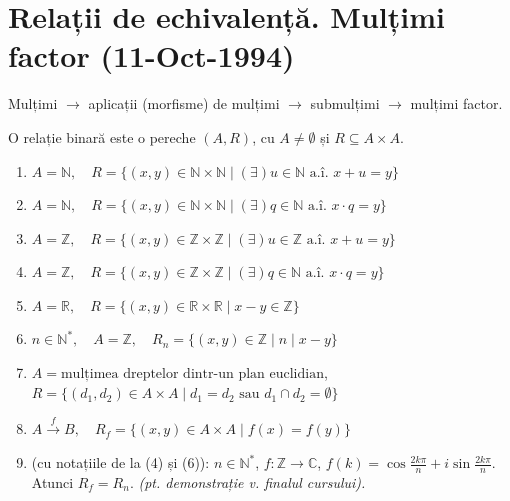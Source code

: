 
\section{Relații de echivalență. Mulțimi factor (11-Oct-1994)}

Mulțimi $\rightarrow$ aplicații (morfisme) de mulțimi $\rightarrow$ submulțimi $\rightarrow$ mulțimi factor.

\begin{definition}
O relație binară este o pereche $(A, R)$, cu $A \neq \emptyset$ și $R \subseteq A \times A$.
\end{definition}

\begin{example}
\begin{enumerate}
    \item[(1)] $A = \mathbb{N}, \quad R = \{(x, y) \in \mathbb{N} \times \mathbb{N} \mid (\exists) u \in \mathbb{N} \text{ a.î. } x + u = y\}$
    \item[(2)] $A = \mathbb{N}, \quad R = \{(x, y) \in \mathbb{N} \times \mathbb{N} \mid (\exists) q \in \mathbb{N} \text{ a.î. } x \cdot q = y\}$
    \item[(1)'] $A = \mathbb{Z}, \quad R = \{(x, y) \in \mathbb{Z} \times \mathbb{Z} \mid (\exists) u \in \mathbb{Z} \text{ a.î. } x + u = y\}$
    \item[(2)'] $A = \mathbb{Z}, \quad R = \{(x, y) \in \mathbb{Z} \times \mathbb{Z} \mid (\exists) q \in \mathbb{N} \text{ a.î. } x \cdot q = y\}$
    \item[(3)] $A = \mathbb{R}, \quad R = \{(x, y) \in \mathbb{R} \times \mathbb{R} \mid x - y \in \mathbb{Z}\}$
    \item[(4)] $n \in \mathbb{N}^*, \quad A = \mathbb{Z}, \quad R_n = \{(x, y) \in \mathbb{Z} \mid n \mid x - y \}$
    \item[(5)] $A = \text{mulțimea dreptelor dintr-un plan euclidian}$, \\ $R = \{(d_1, d_2) \in A \times A \mid d_1 = d_2 \text{ sau } d_1 \cap d_2 = \emptyset\}$
    \item[(6)] $A \xrightarrow{f} B, \quad R_f = \{(x, y) \in A \times A \mid f(x) = f(y)\}$
    \item[(7)] (cu notațiile de la (4) și (6)): $n \in \mathbb{N}^*$, $f: \mathbb{Z} \rightarrow \mathbb{C}$, $f(k) = \cos \frac{2k\pi}{n} + i \sin \frac{2k\pi}{n}$. Atunci $R_f = R_n$. \textit{(pt. demonstrație v. finalul cursului).}
\end{enumerate}
\end{example}


